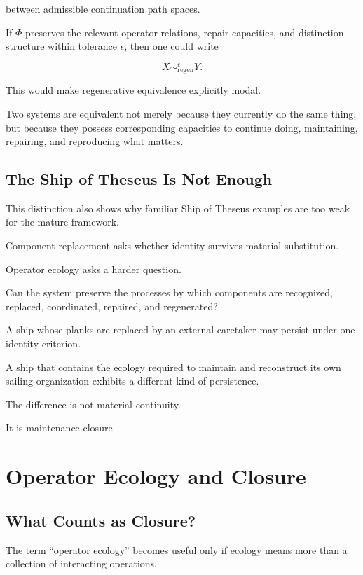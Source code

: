 \documentclass[11pt]{article}
\theoremstyle{remark}
\begin{document}
between admissible continuation path spaces.

If $\Phi$ preserves the relevant operator relations, repair capacities, and distinction structure within tolerance $\epsilon$, then one could write

\begin{equation}
X\sim_{\mathrm{regen}}^\epsilon Y.
\end{equation}

This would make regenerative equivalence explicitly modal.

Two systems are equivalent not merely because they currently do the same thing, but because they possess corresponding capacities to continue doing, maintaining, repairing, and reproducing what matters.

\subsection{The Ship of Theseus Is Not Enough}

This distinction also shows why familiar Ship of Theseus examples are too weak for the mature framework.

Component replacement asks whether identity survives material substitution.

Operator ecology asks a harder question.

Can the system preserve the processes by which components are recognized, replaced, coordinated, repaired, and regenerated?

A ship whose planks are replaced by an external caretaker may persist under one identity criterion.

A ship that contains the ecology required to maintain and reconstruct its own sailing organization exhibits a different kind of persistence.

The difference is not material continuity.

It is maintenance closure.

\section{Operator Ecology and Closure}

\subsection{What Counts as Closure?}

The term ``operator ecology'' becomes useful only if ecology means more than a collection of interacting operations.
\end{document}

